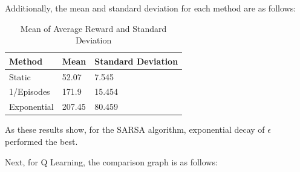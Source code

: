 \documentclass[nohyperref]{article}
\theoremstyle{plain}
\theoremstyle{definition}
\theoremstyle{remark}
\begin{document}
Additionally, the mean and standard deviation for each method are as follows:

\begin{table}[H]
    \begin{tabular}{lll}
    \hline
    Method      & Mean   & Standard Deviation \\ \hline
    Static      & 52.07  & 7.545              \\
    1/Episodes  & 171.9  & 15.454             \\
    Exponential & 207.45 & 80.459             \\ \hline
    \end{tabular}
    \caption{Mean of Average Reward and Standard Deviation}
\end{table}

As these results show, for the SARSA algorithm, exponential decay of $\epsilon$ performed the best.

Next, for Q Learning, the comparison graph is as follows:




\end{document}
